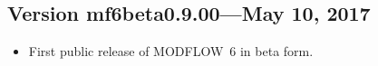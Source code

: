 	\subsection{Version mf6beta0.9.00---May 10, 2017}
	\begin{itemize}
		\item First public release of MODFLOW~6 in beta form. 
	\end{itemize}
